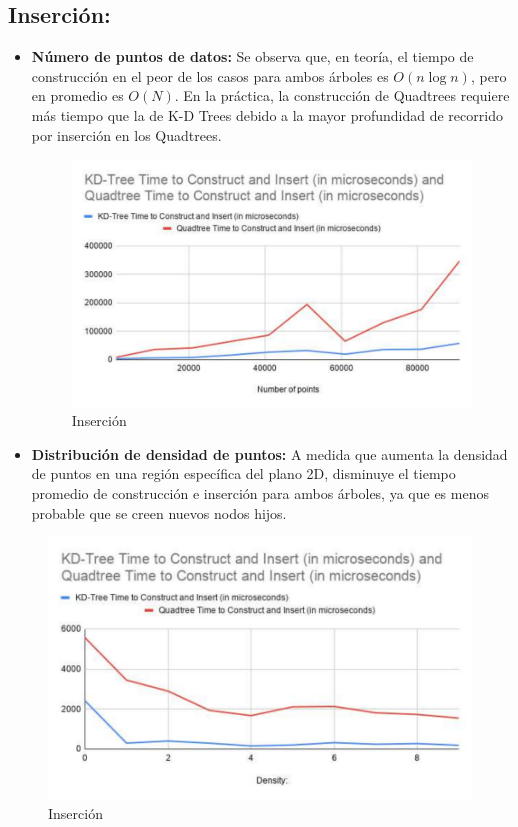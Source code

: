 \documentclass[9pt,a4paper,twoside]{rho-class/rho}
\begin{document}
        \subsection*{Inserción:}
            \begin{itemize}
            \item \textbf{Número de puntos de datos:} Se observa que, en teoría, el tiempo de construcción en el peor de los casos para ambos árboles es $O(n \log n)$, pero en promedio es $O(N)$. En la práctica, la construcción de Quadtrees requiere más tiempo que la de K-D Trees debido a la mayor profundidad de recorrido por inserción en los Quadtrees.
            \begin{figure}[h]
                \centering
                \includegraphics[width=\linewidth]{figures/Insertion.pdf}
                \caption{Inserción \cite{amay12_spatialsearch}}
                \label{fig:representation_figure}
            \end{figure}
            \item \textbf{Distribución de densidad de puntos:} A medida que aumenta la densidad de puntos en una región específica del plano 2D, disminuye el tiempo promedio de construcción e inserción para ambos árboles, ya que es menos probable que se creen nuevos nodos hijos.
            \end{itemize}
            \begin{figure}[h]
                \centering
                \includegraphics[width=\linewidth]{figures/insertion2.pdf}
                \caption{Inserción \cite{amay12_spatialsearch}}
                \label{fig:representation_figure}
            \end{figure}
\end{document}
